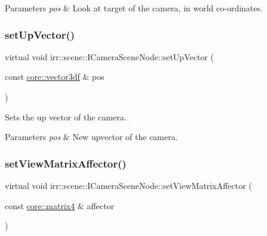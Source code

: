 \begin{DoxyParams}{Parameters}
{\em pos} & Look at target of the camera, in world co-\/ordinates. \\
\hline
\end{DoxyParams}
\mbox{\label{classirr_1_1scene_1_1ICameraSceneNode_a1e74c17d89979fde4738276ccdcc0d3a}} 
\subsubsection{\texorpdfstring{set\+Up\+Vector()}{setUpVector()}}
{\footnotesize\ttfamily virtual void irr\+::scene\+::\+I\+Camera\+Scene\+Node\+::set\+Up\+Vector (\begin{DoxyParamCaption}\item[{const \hyperlink{namespaceirr_1_1core_a06f169d08b5c429f5575acb7edbad811}{core\+::vector3df} \&}]{pos }\end{DoxyParamCaption})\hspace{0.3cm}{\ttfamily [pure virtual]}}



Sets the up vector of the camera. 


\begin{DoxyParams}{Parameters}
{\em pos} & New upvector of the camera. \\
\hline
\end{DoxyParams}
\mbox{\label{classirr_1_1scene_1_1ICameraSceneNode_adb3500cac2a8a47e6a3f48aa343ce2fd}} 
\subsubsection{\texorpdfstring{set\+View\+Matrix\+Affector()}{setViewMatrixAffector()}}
{\footnotesize\ttfamily virtual void irr\+::scene\+::\+I\+Camera\+Scene\+Node\+::set\+View\+Matrix\+Affector (\begin{DoxyParamCaption}\item[{const \hyperlink{namespaceirr_1_1core_a73fa92e638c5ca97efd72da307cc9b65}{core\+::matrix4} \&}]{affector }\end{DoxyParamCaption})\hspace{0.3cm}{\ttfamily [pure virtual]}}



